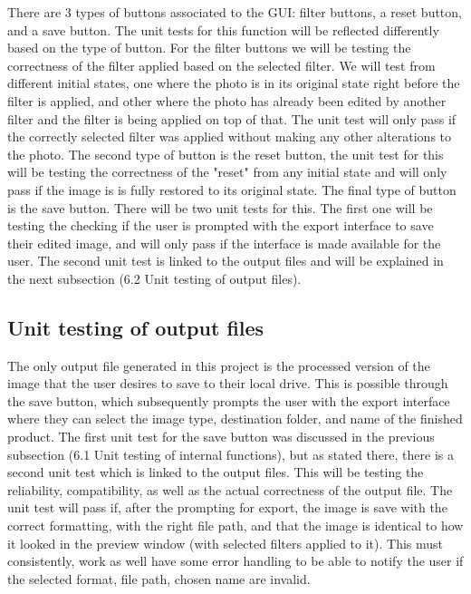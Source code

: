 \documentclass[12pt, titlepage]{article}
\begin{document}
There are 3 types of buttons associated to the GUI: filter buttons, a reset button, and a save button. The unit tests for this function will be reflected differently based on the type of button. For the filter buttons we will be testing the correctness of the filter applied based on the selected filter. We will test from different initial states, one where the photo is in its original state right before the filter is applied, and other where the photo has already been edited by another filter and the filter is being applied on top of that. The unit test will only pass if the correctly selected filter was applied without making any other alterations to the photo. The second type of button is the reset button, the unit test for this will be testing the correctness of the "reset" from any initial state and will only pass if the image is is fully restored to its original state. The final type of button is the save button. There will be two unit tests for this. The first one will be testing the checking if the user is prompted with the export interface to save their edited image, and will only pass if the interface is made available for the user. The second unit test is linked to the output files and will be explained in the next subsection (6.2 Unit testing of output files).
		
\subsection{Unit testing of output files}		

The only output file generated in this project is the processed version of the image that the user desires to save to their local drive. This is possible through the save button, which subsequently prompts the user with the export interface where they can select the image type, destination folder, and name of the finished product. The first unit test for the save button was discussed in the previous subsection (6.1 Unit testing of internal functions), but as stated there, there is a second unit test which is linked to the output files. This will be testing the reliability, compatibility, as well as the actual correctness of the output file. The unit test will pass if, after the prompting for export, the image is save with the correct formatting, with the right file path, and that the image is identical to how it looked in the preview window (with selected filters applied to it). This must consistently, work as well have some error handling to be able to notify the user if the selected format, file path, chosen name are invalid.	
\end{document}
